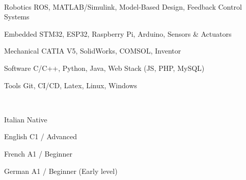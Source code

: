\vspace{-\acvSectionTopSkip}

\begin{minipage}[t]{0.65\textwidth}

    \\

    \begin{cvskills}

        \cvskill
        {Robotics}
        {ROS, MATLAB/Simulink, Model-Based Design, Feedback Control Systems}

        \cvskill
        {Embedded}
        {STM32, ESP32, Raspberry Pi, Arduino, Sensors \& Actuators}

        \cvskill
        {Mechanical}
        {CATIA V5, SolidWorks, COMSOL, Inventor}

        \cvskill
        {Software}
        {C/C++, Python, Java, Web Stack (JS, PHP, MySQL)}

        \cvskill
        {Tools}
        {Git, CI/CD, Latex, Linux, Windows}

    \end{cvskills}

\end{minipage}
%
\hfill
%
\begin{minipage}[t]{0.30\textwidth}

    \\

    \begin{cvskills}

        \cvskill
        {Italian}
        {Native}

        \cvskill
        {English}
        {C1 / Advanced}

        \cvskill
        {French}
        {A1 / Beginner}

        \cvskill
        {German}
        {A1 / Beginner (Early level)}

    \end{cvskills}

\end{minipage}

